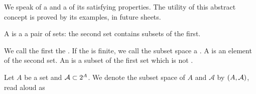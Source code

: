 
\sbasic



\sstart



We speak of a
and a
of its
satisfying properties.
The utility of this
abstract concept
is proved by its examples,
in future sheets.


A
is a a pair of sets:
the second set contains
subsets of the first.

We call the first
the
.
If the
is finite,
we call the subset space a
.
A
is an element of the second set.
An
is a subset of the first set which is not
.



Let $A$ be a set and $\mathcal{A} \subset 2^{A}$.
We denote the subset space of $A$ and $\mathcal{A}$
by $\left(A, \mathcal{A}\right)$, read aloud as 

\strats
